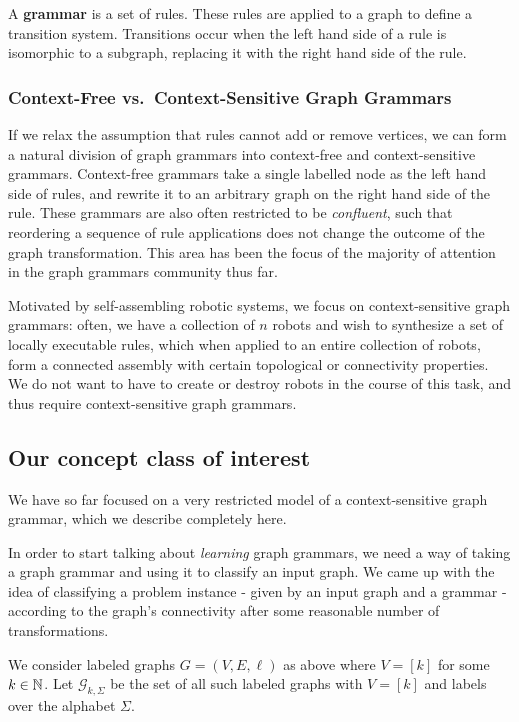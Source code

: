 \documentclass[]{article}
\def\Graphs{\mathcal{G}\xspace}
\begin{document}
A \textbf{grammar} is a set of rules. These rules are applied
 to a graph to define a transition system. Transitions occur
when the left hand side of a rule is isomorphic to a subgraph, replacing it 
with the right hand side of the rule.

\subsubsection{Context-Free vs.~Context-Sensitive Graph
Grammars}\label{context-free-vs.context-sensitive-graph-grammars}

If we relax the assumption that rules cannot add or remove vertices, we
can form a natural division of graph grammars into context-free and
context-sensitive grammars. Context-free grammars take a single labelled
node as the left hand side of rules, and rewrite it to an arbitrary graph on
the right hand side of the rule. These grammars are also
often restricted to be \emph{confluent}, such that reordering a
sequence of rule applications does not change the outcome of the graph
transformation. This area has been the focus of the majority of
attention in the graph grammars community thus far.

Motivated by self-assembling robotic systems, we focus on context-sensitive
graph grammars: often, we have a collection of $n$ robots and wish to synthesize a
set of locally executable rules, which when applied to an entire collection of
robots, form a connected assembly with certain topological or connectivity
properties. We do not want to have to create or destroy robots in the course of
this task, and thus require context-sensitive graph grammars.

\subsection{Our concept class of
  interest}\label{our-concept-class-of-interest}

We have so far focused on a very restricted model of a context-sensitive graph
grammar, which we describe completely here.

In order to start talking about \emph{learning} graph grammars, we need a way of
taking a graph grammar and using it to classify an input graph. We came up with
the idea of classifying a problem instance - given by an input graph and a
grammar - according to the graph's connectivity after some reasonable number of transformations.

We consider labeled graphs $G = (V,E,\ell)$ as above where $V = [k]$ for some
$k\in \N$. Let $\Graphs_{k,\Sigma}$ be the set of all such labeled graphs with
$V=[k]$ and labels over the alphabet $\Sigma$.
\end{document}
